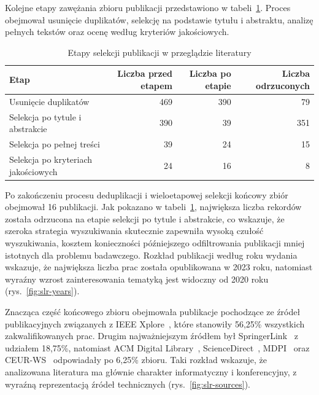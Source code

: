 Kolejne etapy zawężania zbioru publikacji przedstawiono w tabeli~\ref{tab:slr-selection-steps}. Proces obejmował usunięcie duplikatów, selekcję na podstawie tytułu i abstraktu, analizę pełnych tekstów oraz ocenę według kryteriów jakościowych.

\begin{table}[htbp]
    \centering
    \caption{Etapy selekcji publikacji w przeglądzie literatury}
    \label{tab:slr-selection-steps}
    \begin{tabular}{|l|r|r|r|}
        \hline
        \textbf{Etap} & \textbf{Liczba przed etapem} & \textbf{Liczba po etapie} & \textbf{Liczba odrzuconych} \\
        \hline
        Usunięcie duplikatów & 469 & 390 & 79 \\
        Selekcja po tytule i abstrakcie & 390 & 39 & 351 \\
        Selekcja po pełnej treści & 39 & 24 & 15 \\
        Selekcja po kryteriach jakościowych & 24 & 16 & 8 \\
        \hline
    \end{tabular}
\end{table}

Po zakończeniu procesu deduplikacji i wieloetapowej selekcji końcowy zbiór obejmował 16 publikacji. Jak pokazano w tabeli~\ref{tab:slr-selection-steps}, największa liczba rekordów została odrzucona na etapie selekcji po tytule i abstrakcie, co wskazuje, że szeroka strategia wyszukiwania skutecznie zapewniła wysoką czułość wyszukiwania, kosztem konieczności późniejszego odfiltrowania publikacji mniej istotnych dla problemu badawczego. Rozkład publikacji według roku wydania wskazuje, że największa liczba prac została opublikowana w 2023 roku, natomiast wyraźny wzrost zainteresowania tematyką jest widoczny od 2020 roku (rys.~\ref{fig:slr-years}).

Znacząca część końcowego zbioru obejmowała publikacje pochodzące ze źródeł publikacyjnych związanych z IEEE Xplore~\cite{ieeexplore}, które stanowiły 56{,}25\% wszystkich zakwalifikowanych prac. Drugim najważniejszym źródłem był SpringerLink~\cite{springerlink} z udziałem 18{,}75\%, natomiast ACM Digital Library~\cite{acm_dl}, ScienceDirect~\cite{sciencedirect}, MDPI~\cite{mdpi} oraz CEUR-WS~\cite{ceur} odpowiadały po 6{,}25\% zbioru. Taki rozkład wskazuje, że analizowana literatura ma głównie charakter informatyczny i konferencyjny, z wyraźną reprezentacją źródeł technicznych (rys.~\ref{fig:slr-sources}).

